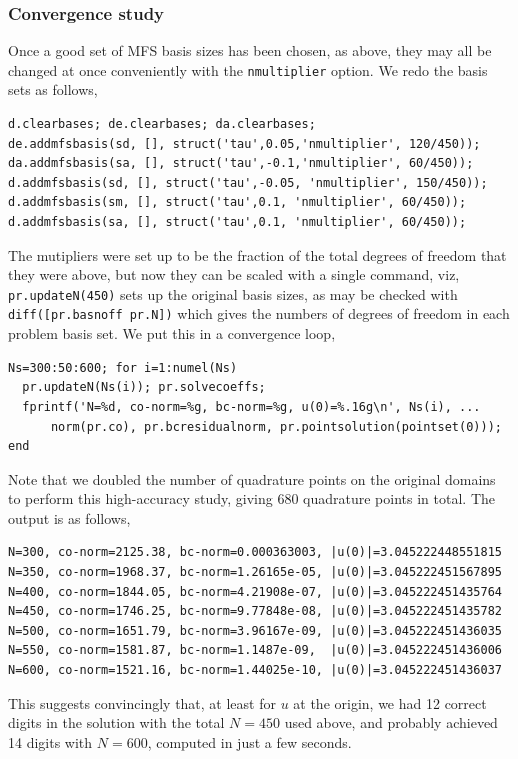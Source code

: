 \subsubsection{Convergence study}
Once a good set of MFS basis sizes has been chosen, as above, they
may all be changed at once conveniently with the {\tt nmultiplier} option.
We redo the basis sets as follows,
\begin{verbatim}
d.clearbases; de.clearbases; da.clearbases;
de.addmfsbasis(sd, [], struct('tau',0.05,'nmultiplier', 120/450));
da.addmfsbasis(sa, [], struct('tau',-0.1,'nmultiplier', 60/450));
d.addmfsbasis(sd, [], struct('tau',-0.05, 'nmultiplier', 150/450));
d.addmfsbasis(sm, [], struct('tau',0.1, 'nmultiplier', 60/450));
d.addmfsbasis(sa, [], struct('tau',0.1, 'nmultiplier', 60/450));
\end{verbatim}
The mutipliers were set up to be the fraction of the total degrees of freedom
that they were above, but now they can be scaled with a single command,
viz, {\tt pr.updateN(450)} sets up the original basis sizes,
as may be checked with {\tt diff([pr.basnoff pr.N])} which gives the
numbers of degrees of freedom in each problem basis set.
We put this in a convergence loop,
\begin{verbatim}
Ns=300:50:600; for i=1:numel(Ns)
  pr.updateN(Ns(i)); pr.solvecoeffs;
  fprintf('N=%d, co-norm=%g, bc-norm=%g, u(0)=%.16g\n', Ns(i), ...
      norm(pr.co), pr.bcresidualnorm, pr.pointsolution(pointset(0)));
end
\end{verbatim}
Note that we doubled the number of quadrature points on the original
domains to perform this high-accuracy study, giving 680 quadrature points in
total.
The output is as follows,
\begin{verbatim}
N=300, co-norm=2125.38, bc-norm=0.000363003, |u(0)|=3.045222448551815
N=350, co-norm=1968.37, bc-norm=1.26165e-05, |u(0)|=3.045222451567895
N=400, co-norm=1844.05, bc-norm=4.21908e-07, |u(0)|=3.045222451435764
N=450, co-norm=1746.25, bc-norm=9.77848e-08, |u(0)|=3.045222451435782
N=500, co-norm=1651.79, bc-norm=3.96167e-09, |u(0)|=3.045222451436035
N=550, co-norm=1581.87, bc-norm=1.1487e-09,  |u(0)|=3.045222451436006
N=600, co-norm=1521.16, bc-norm=1.44025e-10, |u(0)|=3.045222451436037
\end{verbatim}
This suggests convincingly
that, at least for $u$ at the origin, we had 12 correct
digits in the solution with the total $N=450$ used above,
and probably achieved 14 digits with $N=600$,
computed in just a few seconds.




